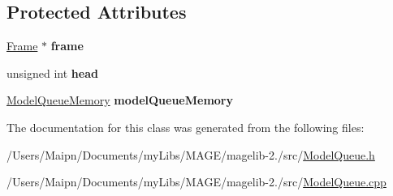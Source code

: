 \subsection*{Protected Attributes}
\begin{DoxyCompactItemize}
\item 
\hypertarget{class_m_a_g_e_1_1_model_queue_a15ff44566b9c488e977e2fd8cf11a85b}{\hyperlink{struct_m_a_g_e_1_1_frame}{Frame} $\ast$ {\bfseries frame}}\label{class_m_a_g_e_1_1_model_queue_a15ff44566b9c488e977e2fd8cf11a85b}

\item 
\hypertarget{class_m_a_g_e_1_1_model_queue_a8ce20b001dec594aeb232d0bab3adc6f}{unsigned int {\bfseries head}}\label{class_m_a_g_e_1_1_model_queue_a8ce20b001dec594aeb232d0bab3adc6f}

\item 
\hypertarget{class_m_a_g_e_1_1_model_queue_aac94662cccf3527e70879cc3f58c2ece}{\hyperlink{class_m_a_g_e_1_1_model_queue_memory}{Model\-Queue\-Memory} {\bfseries model\-Queue\-Memory}}\label{class_m_a_g_e_1_1_model_queue_aac94662cccf3527e70879cc3f58c2ece}

\end{DoxyCompactItemize}


The documentation for this class was generated from the following files\-:\begin{DoxyCompactItemize}
\item 
/\-Users/\-Maipn/\-Documents/my\-Libs/\-M\-A\-G\-E/magelib-\/2./src/\hyperlink{_model_queue_8h}{Model\-Queue.\-h}\item 
/\-Users/\-Maipn/\-Documents/my\-Libs/\-M\-A\-G\-E/magelib-\/2./src/\hyperlink{_model_queue_8cpp}{Model\-Queue.\-cpp}\end{DoxyCompactItemize}

